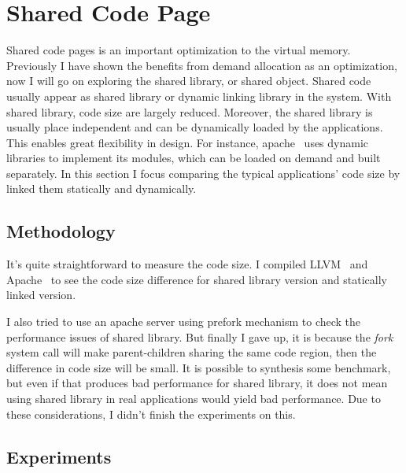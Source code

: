 \section{Shared Code Page}
	\label{sec:sharedobj}
Shared code pages is an important optimization to the virtual memory. Previously
I have shown the benefits from demand allocation as an optimization, now I will
go on exploring the shared library, or shared object.  Shared code usually
appear as shared library or dynamic linking library in the system.  With shared
library, code size are largely reduced.  Moreover, the shared library is
usually place independent and can be dynamically loaded by the applications.
This enables great flexibility in design. For instance, apache~\cite{apache}
uses dynamic libraries to implement its modules, which can be loaded on demand
and built separately. In this section I focus comparing the typical
applications' code size by linked them statically and dynamically.

\subsection{Methodology}
It's quite straightforward to measure the code size. I compiled
LLVM~\cite{llvm} and Apache~\cite{apache} to see the code size difference for
shared library version and statically linked version.

I also tried to use an apache server using prefork mechanism to check the
performance issues of shared library. But finally I gave up, it is because the
\emph{fork} system call will make parent-children sharing the same code region,
then the difference in code size will be small. It is possible to synthesis
some benchmark, but even if that produces bad performance for shared library, it
does not mean using shared library in real applications would yield bad
performance. Due to these considerations, I didn't finish the experiments on this. 

\subsection{Experiments}


